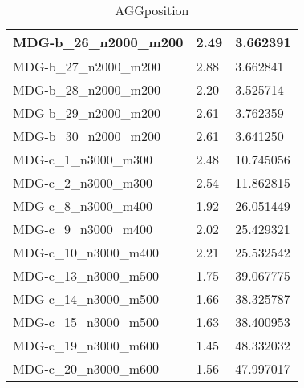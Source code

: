 \documentclass[10pt,a4paper]{article}
\begin{document}
\begin{table}[]
\begin{tabular}{|l|l|l|}
		MDG-b\_26\_n2000\_m200 & 2.49                               & 3.662391                             \\ \hline
		MDG-b\_27\_n2000\_m200 & 2.88                               & 3.662841                             \\ \hline
		MDG-b\_28\_n2000\_m200 & 2.20                               & 3.525714                             \\ \hline
		MDG-b\_29\_n2000\_m200 & 2.61                               & 3.762359                             \\ \hline
		MDG-b\_30\_n2000\_m200 & 2.61                               & 3.641250                             \\ \hline
		MDG-c\_1\_n3000\_m300  & 2.48                               & 10.745056                            \\ \hline
		MDG-c\_2\_n3000\_m300  & 2.54                               & 11.862815                            \\ \hline
		MDG-c\_8\_n3000\_m400  & 1.92                               & 26.051449                            \\ \hline
		MDG-c\_9\_n3000\_m400  & 2.02                               & 25.429321                            \\ \hline
		MDG-c\_10\_n3000\_m400 & 2.21                               & 25.532542                            \\ \hline
		MDG-c\_13\_n3000\_m500 & 1.75                               & 39.067775                            \\ \hline
		MDG-c\_14\_n3000\_m500 & 1.66                               & 38.325787                            \\ \hline
		MDG-c\_15\_n3000\_m500 & 1.63                               & 38.400953                            \\ \hline
		MDG-c\_19\_n3000\_m600 & 1.45                               & 48.332032                            \\ \hline
		MDG-c\_20\_n3000\_m600 & 1.56                               & 47.997017                            \\ \hline
	\end{tabular}
	\caption{AGGposition}
	\label{table:AGGposition}
\end{table}
\end{document}
